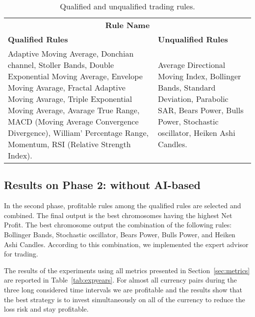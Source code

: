 \begin{table}[h!]
  \begin{center} 
    \caption{Qualified and unqualified trading rules.}
    \label{tab:qualrules}
    \begin{tabular}{p{6cm}  p{6cm} }
    \hline
    \multicolumn{2}{c}{\textbf{Rule Name}}
    \\\cline{1-2}
    \textbf{Qualified Rules} & \textbf{Unqualified Rules}\\
    \hline
    Adaptive Moving Average, Donchian channel, Stoller Bands,  Double Exponential Moving Average, Envelope Moving Avarage,  Fractal Adaptive Moving Avarage, Triple Exponential Moving Average, Avarage True Range,  MACD (Moving Average Convergence Divergence),  William' Percentage Range, Momentum, RSI (Relative Strength Index). 
    &
    Average Directional Moving Index, Bollinger Bands, Standard Deviation, Parabolic SAR, Bears Power, Bulls Power, Stochastic oscillator, Heiken Ashi Candles.\\
      \hline
    \end{tabular}
  \end{center}
\end{table}

\subsection{Results on Phase 2: without AI-based}
In the second phase, profitable rules among the qualified rules are selected and combined. The final output is the best chromosomes having the highest Net Profit.
The best chromosome output the combination of the following rules: Bollinger Bands, Stochastic oscillator, Bears Power, Bulls Power, and Heiken Ashi Candles. According to this combination, we implemented the expert advisor for trading. 

The results of the experiments using all metrics presented in Section~\ref{sec:metrics} are reported in Table~\ref{tab:expyears}. For almost all currency pairs during the three long considered time intervals we are profitable and the results show that the best strategy is to invest simultaneously on all of the currency to reduce the loss risk and stay profitable.

